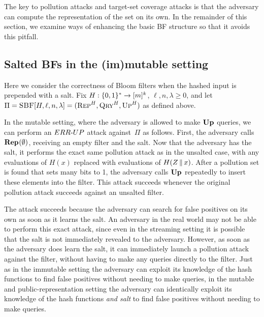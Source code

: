 
The key to pollution attacks and target-set coverage attacks is that the
adversary can compute the representation of the set on its own. In the remainder
of this section, we examine ways of enhancing the basic BF structure so that it
avoids this pitfall.

\subsection{Salted BFs in the (im)mutable setting}
%
Here we consider the correctness of Bloom filters when the hashed input is
prepended with a salt.
%
Fix $H:\{0,1\}^*\to[m]^k$, $\ell,n,\lambda\geq0$, and let
$\Pi = \textnormal{\textsc{SBF}}[H,\ell,n,\lambda] = (\textnormal{\textsc{Rep}}^H, \textnormal{\textsc{Qry}}^H, \textnormal{\textsc{Up}}^H)$ as defined above.

In the mutable setting, where the adversary is allowed to make $\textup{\textbf{Up}}\hspace{0.5pt}$ queries,
we can perform an ${ERR\mbox{-}UP}$ attack against~$\Pi$ as follows. First, the adversary
calls $\textup{\textbf{Rep}}\hspace{0.5pt}(\emptyset)$, receiving an empty filter and the salt. Now that the
adversary has the salt, it performs the exact same pollution attack as in the
unsalted case, with any evaluations of $H(x)$ replaced with evaluations of
$H(Z \, \| \, x)$. After a pollution set is found that sets many bits to 1, the
adversary calls $\textup{\textbf{Up}}\hspace{0.5pt}$ repeatedly to insert these elements into the filter. This
attack succeeds whenever the original pollution attack succeeds against an
unsalted filter.

%

The attack succeeds because the adversary can search for false positives on its
own as soon as it learns the salt. An adversary in the real world may not be
able to perform this exact attack, since even in the streaming setting it is
possible that the salt is not immediately revealed to the adversary. However, as
soon as the adversary does learn the salt, it can immediately launch a pollution
attack against the filter, without having to make any queries directly to the
filter. Just as in the immutable setting the adversary can exploit its knowledge
of the hash functions to find false positives without needing to make queries,
in the mutable and public-representation setting the adversary can identically
exploit its knowledge of the hash functions \textit{and salt} to find false
positives without needing to make queries.

